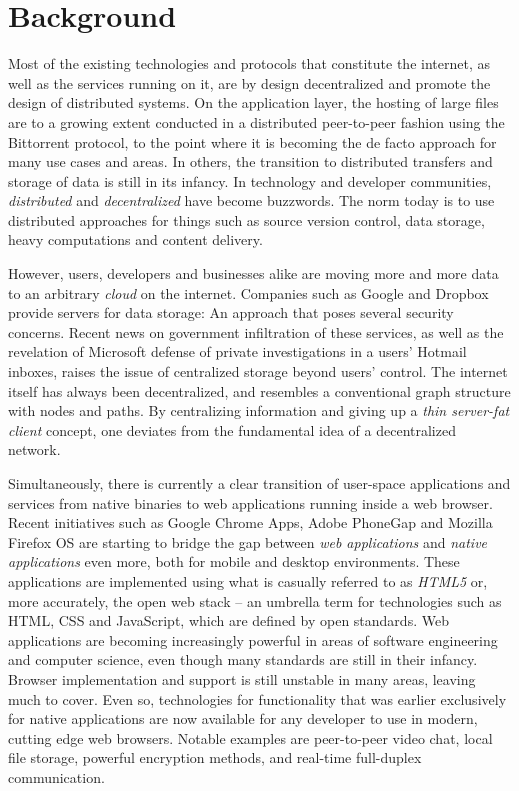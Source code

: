 \section{Background}

Most of the existing technologies and protocols that constitute the internet, as well as the services running on it, are by design decentralized and promote the design of distributed systems\cite{InternetDecenterlized:Online}. On the application layer, the hosting of large files are to a growing extent conducted in a distributed peer-to-peer fashion using the Bittorrent protocol, to the point where it is becoming the de facto approach for many use cases and areas. In others, the transition to distributed transfers and storage of data is still in its infancy. In technology and developer communities, \emph{distributed} and \emph{decentralized} have become buzzwords. The norm today is to use distributed approaches for things such as source version control, data storage, heavy computations and content delivery.

However, users, developers and businesses alike are moving more and more data to an arbitrary \emph{cloud} on the internet. Companies such as Google and Dropbox provide servers for data storage: An approach that poses several security concerns. Recent news on government infiltration of these services, as well as the revelation of Microsoft defense of private investigations in a users' Hotmail inboxes\cite{Frank:2014}, raises the issue of centralized storage beyond users' control. The internet itself has always been decentralized, and resembles a conventional graph structure with nodes and paths. By centralizing information and giving up a \emph{thin server-fat client} concept, one deviates from the fundamental idea of a decentralized network.


Simultaneously, there is currently a clear transition of user-space applications and services from native binaries to web applications running inside a web browser. Recent initiatives such as Google Chrome Apps, Adobe PhoneGap and Mozilla Firefox OS are starting to bridge the gap between \emph{web applications} and \emph{native applications} even more, both for mobile and desktop environments. These applications are implemented using what is casually referred to as \emph{HTML5} or, more accurately, the open web stack – an umbrella term for technologies such as HTML, CSS and JavaScript, which are defined by open standards. Web applications are becoming increasingly powerful in areas of software engineering and computer science, even though many standards are still in their infancy. Browser implementation and support is still unstable in many areas, leaving much to cover. Even so, technologies for functionality that was earlier exclusively for native applications are now available for any developer to use in modern, cutting edge web browsers. Notable examples are peer-to-peer video chat, local file storage, powerful encryption methods, and real-time full-duplex communication.

